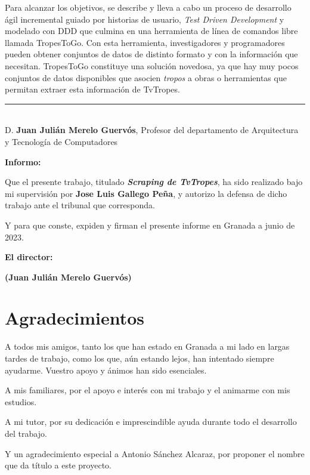 Para alcanzar los objetivos, se describe y lleva a cabo un proceso de desarrollo
ágil incremental guiado por historias de usuario, \textit{Test Driven
Development} y modelado con DDD que culmina en una herramienta de línea de
comandos libre llamada TropesToGo. Con esta herramienta, investigadores y
programadores pueden obtener conjuntos de datos de distinto formato y con la
información que necesitan. TropesToGo constituye una solución novedosa, ya que
hay muy pocos conjuntos de datos disponibles que asocien \textit{tropos} a obras
o herramientas que permitan extraer esta información de TvTropes.

\cleardoublepage



\cleardoublepage

\thispagestyle{empty}

\noindent\rule[-1ex]{\textwidth}{2pt}\\[4.5ex]

D. \textbf{Juan Julián Merelo Guervós}, Profesor del departamento de Arquitectura y Tecnología de Computadores 

\vspace{0.5cm}

\textbf{Informo:}

\vspace{0.5cm}

Que el presente trabajo, titulado \textit{\textbf{Scraping de TvTropes}}, ha sido realizado bajo mi supervisión por \textbf{Jose Luis Gallego Peña}, y autorizo la defensa de dicho trabajo ante el tribunal que corresponda.

\vspace{0.5cm}

Y para que conste, expiden y firman el presente informe en Granada a junio de 2023.

\vspace{1cm}

\textbf{El director: }

\vspace{5cm}

\noindent \textbf{(Juan Julián Merelo Guervós)}

\chapter*{Agradecimientos}

A todos mis amigos, tanto los que han estado en Granada a mi lado en largas
tardes de trabajo, como los que, aún estando lejos, han intentado siempre
ayudarme. Vuestro apoyo y ánimos han sido esenciales.

A mis familiares, por el apoyo e interés con mi trabajo y el animarme con mis
estudios.

A mi tutor, por su dedicación e imprescindible ayuda durante todo el desarrollo
del trabajo.

Y un agradecimiento especial a Antonio Sánchez Alcaraz, por proponer el nombre
que da título a este proyecto.